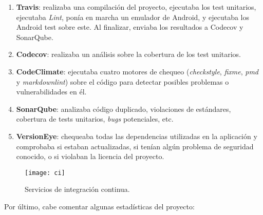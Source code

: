 \begin{enumerate}
\def\labelenumi{\arabic{enumi}.}
\tightlist
\item
  \textbf{Travis}: realizaba una compilación del proyecto, ejecutaba los
  test unitarios, ejecutaba \emph{Lint}, ponía en marcha un emulador de
  Android, y ejecutaba los Android test sobre este. Al finalizar,
  enviaba los resultados a Codecov y SonarQube.
\item
  \textbf{Codecov}: realizaba un análisis sobre la cobertura de los test
  unitarios.
\item
  \textbf{CodeClimate}: ejecutaba cuatro motores de chequeo
  (\emph{checkstyle}, \emph{fixme}, \emph{pmd} y \emph{markdownlint})
  sobre el código para detectar posibles problemas o vulnerabilidades en
  él.
\item
  \textbf{SonarQube}: analizaba código duplicado, violaciones de
  estándares, cobertura de tests unitarios, \emph{bugs} potenciales, etc.
\item
  \textbf{VersionEye}: chequeaba todas las dependencias utilizadas en la
  aplicación y comprobaba si estaban actualizadas, si tenían algún
  problema de seguridad conocido, o si violaban la licencia del
  proyecto.
\end{enumerate}

\begin{figure}[!h]
	\centering
	\texttt{[image: ci]}
	\caption{Servicios de integración continua.}\label{fig:ci}
\end{figure}

Por último, cabe comentar algunas estadísticas del proyecto:

